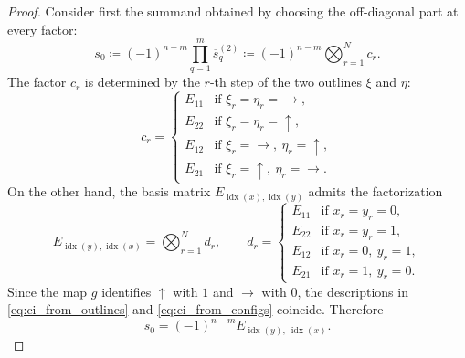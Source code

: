 \documentclass[10pt,a4paper]{amsart}
\begin{document}
\begin{proof}
Consider first the summand obtained by choosing the off-diagonal part at every factor:
\[
s_0\coloneqq (-1)^{n-m}\prod_{q=1}^{m}\overline{s}_q^{(2)}
      \coloneqq(-1)^{n-m}\bigotimes_{r=1}^{N}c_r.
\]
The factor $c_r$ is determined by the $r$-th step of the two outlines $\xi$ and $\eta$:
\begin{equation}
\label{eq:ci_from_outlines}
c_r=
\begin{cases}
E_{11} & \text{if } \xi_r=\eta_r=\rightarrow,\\
E_{22} & \text{if } \xi_r=\eta_r=\uparrow,\\
E_{12} & \text{if } \xi_r=\rightarrow,\ \eta_r=\uparrow,\\
E_{21} & \text{if } \xi_r=\uparrow,\ \eta_r=\rightarrow.
\end{cases}
\end{equation}
On the other hand, the basis matrix $E_{\operatorname{idx}(x),\operatorname{idx}(y)}$ admits the factorization
\begin{equation}
\label{eq:ci_from_configs}
E_{\operatorname{idx}(y),\operatorname{idx}(x)}=\bigotimes_{r=1}^{N}d_r,
\qquad
d_r=
\begin{cases}
E_{11} & \text{if } x_r=y_r=0,\\
E_{22} & \text{if } x_r=y_r=1,\\
E_{12} & \text{if } x_r=0,\ y_r=1,\\
E_{21} & \text{if } x_r=1,\ y_r=0.
\end{cases}
\end{equation}
Since the map $g$ identifies $\uparrow$ with $1$ and $\rightarrow$ with $0$, the descriptions in \eqref{eq:ci_from_outlines} and \eqref{eq:ci_from_configs} coincide. Therefore
\[
s_0=(-1)^{n-m}E_{\operatorname{idx}(y),\ \operatorname{idx}(x)}.
\]


\end{proof}
\end{document}
